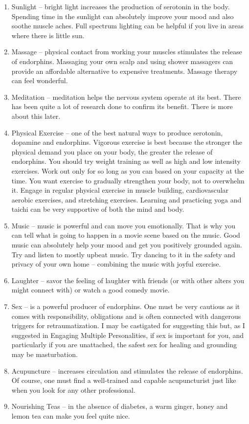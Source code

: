 \documentclass[]{book}
\begin{document}
\begin{enumerate}
\def\labelenumi{\arabic{enumi}.}
\item
  Sunlight -- bright light increases the production of serotonin in the body. Spending time in the sunlight can absolutely improve your mood and also soothe muscle aches. Full spectrum lighting can be helpful if you live in areas where there is little sun.
\item
  Massage -- physical contact from working your muscles stimulates the release of endorphins. Massaging your own scalp and using shower massagers can provide an affordable alternative to expensive treatments. Massage therapy can feel wonderful.
\item
  Meditation -- meditation helps the nervous system operate at its best. There has been quite a lot of research done to confirm its benefit. There is more about this later.
\item
  Physical Exercise -- one of the best natural ways to produce serotonin, dopamine and endorphins. Vigorous exercise is best because the stronger the physical demand you place on your body, the greater the release of endorphins. You should try weight training as well as high and low intensity exercises. Work out only for so long as you can based on your capacity at the time. You want exercise to gradually strengthen your body, not to overwhelm it. Engage in regular physical exercise in muscle building, cardiovascular aerobic exercises, and stretching exercises. Learning and practicing yoga and taichi can be very supportive of both the mind and body.
\item
  Music -- music is powerful and can move you emotionally. That is why you can tell what is going to happen in a movie scene based on the music. Good music can absolutely help your mood and get you positively grounded again. Try and listen to mostly upbeat music. Try dancing to it in the safety and privacy of your own home -- combining the music with joyful exercise.
\item
  Laughter -- savor the feeling of laughter with friends (or with other alters you might connect with) or watch a good comedy movie.
\item
  Sex -- is a powerful producer of endorphins. One must be very cautious as it comes with responsibility, obligations and is often connected with dangerous triggers for retraumatization. I may be castigated for suggesting this but, as I suggested in Engaging Multiple Personalities, if sex is important for you, and particularly if you are unattached, the safest sex for healing and grounding may be masturbation.
\item
  Acupuncture -- increases circulation and stimulates the release of endorphins. Of course, one must find a well-trained and capable acupuncturist just like when you look for any other professional.
\item
  Nourishing Teas -- in the absence of diabetes, a warm ginger, honey and lemon tea can make you feel quite nice.
\end{enumerate}
\end{document}
